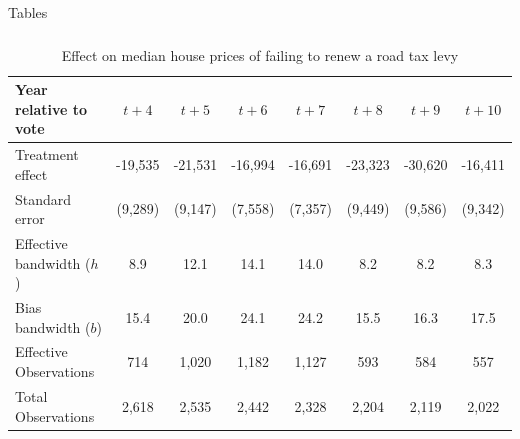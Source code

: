 \documentclass{beamer}
\begin{document}
\begin{frame}{Tables}
\frametitle{}
\begin{table}[ht]
    \centering
    \caption{Effect on median house prices of failing to renew a road tax levy}
    \label{tab:median_sale_amount}
    \scriptsize %
    \begin{tabular}{p{1.5cm}ccccccc}
        \hline
        \textbf{Year relative to vote} & \textbf{$t + 4$} & \textbf{$t + 5$} & \textbf{$t + 6$} & \textbf{$t + 7$} & \textbf{$t + 8$} & \textbf{$t + 9$} & \textbf{$t + 10$} \\
        \hline
        Treatment effect & -19,535 & -21,531 & -16,994 & -16,691 & -23,323 & -30,620 & -16,411 \\
        Standard error & (9,289) & (9,147) & (7,558) & (7,357) & (9,449) & (9,586) & (9,342) \\
        Effective bandwidth ($h$) & 8.9 & 12.1 & 14.1 & 14.0 & 8.2 & 8.2 & 8.3 \\
        Bias bandwidth ($b$) & 15.4 & 20.0 & 24.1 & 24.2 & 15.5 & 16.3 & 17.5 \\
        Effective Observations & 714 & 1,020 & 1,182 & 1,127 & 593 & 584 & 557 \\
        Total Observations & 2,618 & 2,535 & 2,442 & 2,328 & 2,204 & 2,119 & 2,022 \\
        \hline
    \end{tabular}
\end{table}
\end{frame}
\end{document}
